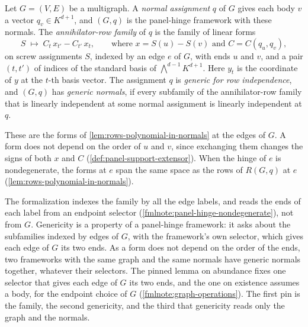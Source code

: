\begin{definition}
  \label{def:generic-normals}
  \leanok
  Let $G = (V, E)$ be a multigraph. A \emph{normal assignment} $q$ of
  $G$ gives each body $v$ a vector $q_v \in K^{d+1}$, and $(G, q)$ is
  the panel-hinge framework with these normals. The
  \emph{annihilator-row family} of $q$ is the family of linear forms
  \[
    S \;\mapsto\; C_t\, x_{t'} - C_{t'}\, x_t,
    \qquad \text{where } x = S(u) - S(v) \text{ and }
    C = C(q_u, q_v),
  \]
  on screw assignments $S$, indexed by an edge $e$ of $G$, with ends
  $u$ and $v$, and a pair $(t, t')$ of indices of the standard basis of
  $\bigwedge^{d-1}K^{d+1}$. Here $y_t$ is the coordinate of $y$ at the
  $t$-th basis vector. The assignment $q$ is \emph{generic for row
  independence}, and $(G, q)$ has \emph{generic normals}, if every
  subfamily of the annihilator-row family that is linearly independent
  at some normal assignment is linearly independent at $q$.
\end{definition}

These are the forms of \cref{lem:rows-polynomial-in-normals} at the
edges of $G$. A form does not depend on the order of $u$ and $v$,
since exchanging them changes the signs of both $x$ and $C$
(\cref{def:panel-support-extensor}). When the hinge of $e$ is
nondegenerate, the forms at $e$ span the same space as the rows of
$R(G, q)$ at $e$ (\cref{lem:rows-polynomial-in-normals}).

\begin{fmlnote}
  \label{fmlnote:generic-normals-selector}
  The formalization indexes the family by all the edge labels, and
  reads the ends of each label from an endpoint selector
  (\cref{fmlnote:panel-hinge-nondegenerate}), not from $G$. Genericity
  is a property of a panel-hinge framework: it asks about the
  subfamilies indexed by edges of $G$, with the framework's own
  selector, which gives each edge of $G$ its two ends. As a form does
  not depend on the order of the ends, two frameworks with the same
  graph and the same normals have generic normals together, whatever
  their selectors. The pinned lemma on abundance fixes one selector
  that gives each edge of $G$ its two ends, and the one on existence
  assumes a body, for the endpoint choice of $G$
  (\cref{fmlnote:graph-operations}). The first pin is the family, the
  second genericity, and the third that genericity reads only the graph
  and the normals.
\end{fmlnote}

